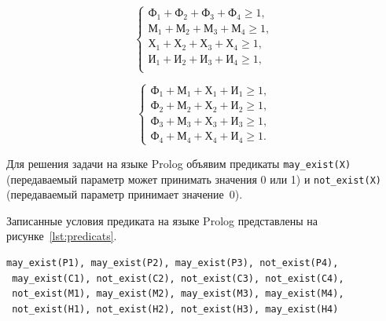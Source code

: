 \begin{minipage}[h!]{0.45\linewidth}
  \begin{equation*}
    \left\{
      \begin{aligned}
        \texttt{Ф}_1 + \texttt{Ф}_2 + \texttt{Ф}_3 + \texttt{Ф}_4 \ge 1, \\
        \texttt{М}_1 + \texttt{М}_2 + \texttt{М}_3 + \texttt{М}_4 \ge 1, \\
        \texttt{Х}_1 + \texttt{Х}_2 + \texttt{Х}_3 + \texttt{Х}_4 \ge 1, \\
        \texttt{И}_1 + \texttt{И}_2 + \texttt{И}_3 + \texttt{И}_4 \ge 1, \\
      \end{aligned}
    \right.
  \end{equation*}
\end{minipage}
\hfill
\begin{minipage}[h!]{0.45\linewidth}
  \begin{equation*}
    \left\{
      \begin{aligned}
        \texttt{Ф}_1 + \texttt{М}_1 + \texttt{Х}_1 + \texttt{И}_1 \ge 1, \\
        \texttt{Ф}_2 + \texttt{М}_2 + \texttt{Х}_2 + \texttt{И}_2 \ge 1, \\
        \texttt{Ф}_3 + \texttt{М}_3 + \texttt{Х}_3 + \texttt{И}_3 \ge 1, \\
        \texttt{Ф}_4 + \texttt{М}_4 + \texttt{Х}_4 + \texttt{И}_4 \ge 1.
      \end{aligned}
    \right.
  \end{equation*}
\end{minipage}

\vspace{7mm}

Для решения задачи на языке Prolog объявим предикаты \texttt{may\_exist(X)}
(передаваемый параметр может принимать значения 0 или 1)
и \texttt{not\_exist(X)} (передаваемый параметр принимает значение~0).

Записанные условия предиката на языке Prolog представлены на рисунке~\ref{lst:predicats}.
\begin{lstlisting}[style=source_code,caption=Условия предиката программы,label=lst:predicats]
 may_exist(P1), may_exist(P2), may_exist(P3), not_exist(P4),
 may_exist(C1), not_exist(C2), not_exist(C3), not_exist(C4),
 not_exist(M1), may_exist(M2), may_exist(M3), may_exist(M4),
 not_exist(H1), not_exist(H2), not_exist(H3), may_exist(H4)
\end{lstlisting}

